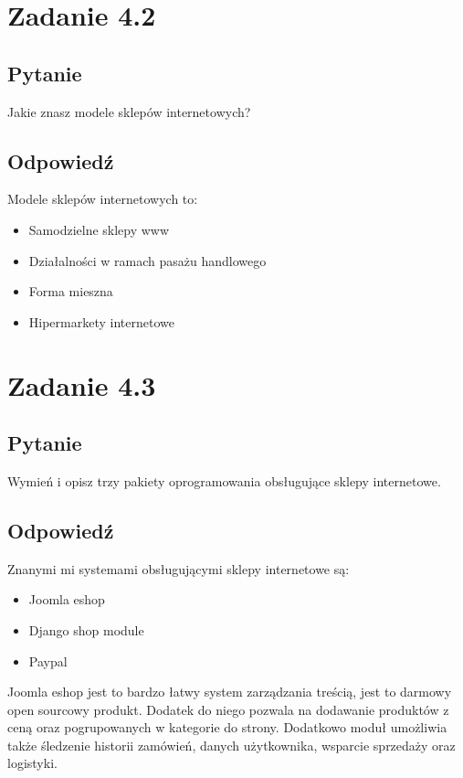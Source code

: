 \documentclass[paper=a4, fontsize=11pt]{scrartcl} %
\numberwithin{equation}{section} %
\numberwithin{figure}{section} %
\numberwithin{table}{section} %
\begin{document}
\section{Zadanie 4.2}

\subsection {Pytanie}

Jakie znasz modele sklepów internetowych?

\subsection {Odpowiedź}

Modele sklepów internetowych to:
\begin{itemize}
  \item Samodzielne sklepy www
  \item Działalności w ramach pasażu handlowego
  \item Forma mieszna
  \item Hipermarkety internetowe
\end{itemize}

\section{Zadanie 4.3}

\subsection {Pytanie}

Wymień i opisz trzy pakiety oprogramowania obsługujące sklepy internetowe.

\subsection {Odpowiedź}

Znanymi mi systemami obsługującymi sklepy internetowe są:
\begin{itemize}
  \item Joomla eshop
  \item Django shop module
  \item Paypal
\end{itemize}

Joomla eshop jest to bardzo łatwy system zarządzania treścią, jest to darmowy
open sourcowy produkt. Dodatek do niego pozwala na dodawanie produktów z ceną 
oraz pogrupowanych w kategorie do strony. Dodatkowo moduł umożliwia także śledzenie
historii zamówień, danych użytkownika, wsparcie sprzedaży oraz logistyki.
\end{document}
